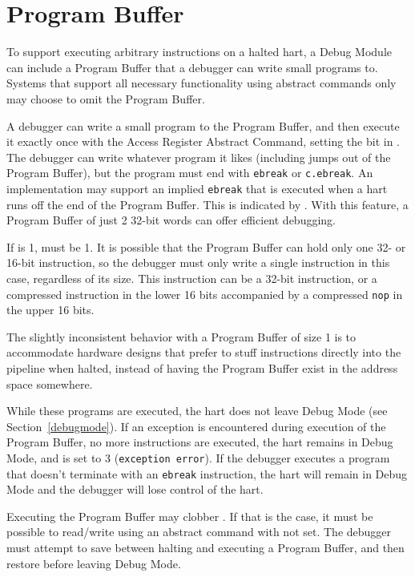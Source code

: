 

\section{Program Buffer} \label{programbuffer}

To support executing arbitrary instructions on a halted hart,
a Debug Module can include a Program Buffer that a debugger
can write small programs to. Systems
that support all necessary functionality using abstract commands
only may choose to omit the Program Buffer.

A debugger can write a small program to the Program Buffer, and then
execute it exactly once with the Access Register Abstract Command,
setting the \Fpostexec bit in \Rcommand.
The debugger can write whatever program it likes (including jumps out of the
Program Buffer), but the program must end with
{\tt ebreak} or {\tt c.ebreak}. An implementation may support
an implied {\tt ebreak} that is executed when a hart runs off the end of the
Program Buffer. This is indicated by \Fimpebreak. With this feature, a Program
Buffer of just 2 32-bit words can offer efficient debugging.

If \Fprogbufsize is 1, \Fimpebreak must be 1. It is possible that the Program
Buffer can hold only one 32- or 16-bit instruction, so the debugger must only
write a single instruction in this case, regardless of its size.
This instruction can be a 32-bit
instruction, or a compressed instruction in the lower 16 bits accompanied by a
compressed {\tt nop} in the upper 16 bits.

\begin{commentary}
    The slightly inconsistent behavior with a Program Buffer of size 1 is to
    accommodate hardware designs that prefer to stuff instructions directly
    into the pipeline when halted, instead of having the Program Buffer exist
    in the address space somewhere.
\end{commentary}

While these programs are executed, the hart does not leave Debug Mode (see
Section~\ref{debugmode}).  If an exception is encountered during execution of
the Program Buffer, no more instructions are executed, the hart remains in Debug
Mode, and \Fcmderr is set to 3 ({\tt exception error}).  If the debugger
executes a program that doesn't terminate with an {\tt ebreak} instruction, the
hart will remain in Debug Mode and the debugger will lose control of the hart.

Executing the Program Buffer may clobber \Rdpc. If that is the case, it must be
possible to read/write \Rdpc using an abstract command with \Fpostexec not set.
The debugger must attempt to save \Rdpc between halting and
executing a Program Buffer, and then restore \Rdpc before leaving Debug Mode.

